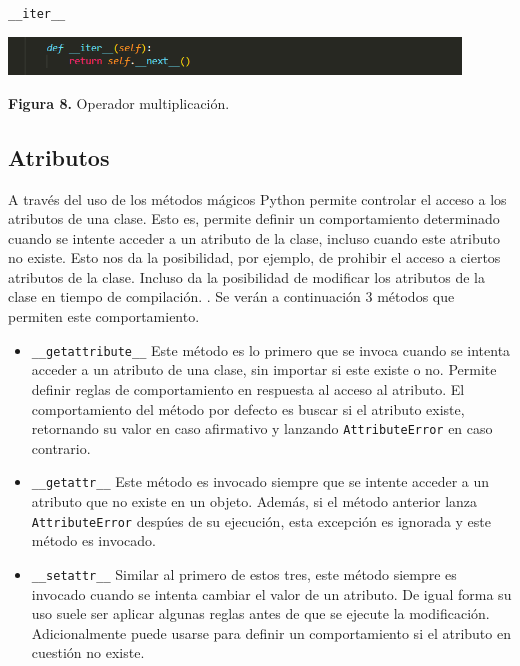 \documentclass[10pt]{article} %
\newcommand{\csl}[1]{\colorbox{backcolour}{\texttt{#1}}}
\newcommand{\imgcaption}[2]{\tiny \textbf{Figura #1.} #2.}
\newcommand{\mgc}[2][]{\colorbox{backcolour}{\texttt{\_\_#2\_\_#1}}}
\begin{document}
\mgc{iter}

\begin{center}
	\includegraphics[width=12cm]{iter.png}
	
	\imgcaption{8}{Operador multiplicaci\'on}
\end{center}

\subsection{Atributos}

A trav\'es del uso de los m\'etodos m\'agicos Python permite controlar el acceso a los atributos de una clase. Esto es, permite definir un comportamiento determinado cuando se intente acceder a un atributo de la clase, incluso cuando este atributo no existe. Esto nos da la posibilidad, por ejemplo, de prohibir el acceso a ciertos atributos de la clase. Incluso da la posibilidad de modificar los atributos de la clase en tiempo de compilaci\'on. . Se ver\'an a continuaci\'on 3  m\'etodos que permiten este comportamiento.

\begin{itemize}
	\item \mgc{getattribute} Este m\'etodo es lo primero que se invoca cuando se intenta acceder a un atributo de una clase, sin importar si este existe o no. Permite definir reglas de comportamiento en respuesta al acceso al atributo. El comportamiento del m\'etodo por defecto es buscar si el atributo existe, retornando su valor en caso afirmativo y lanzando \csl{AttributeError} en caso contrario.
	\item \mgc{getattr} Este m\'etodo es invocado siempre que se intente acceder a un atributo que no existe en un objeto. Adem\'as, si el m\'etodo anterior lanza \csl{AttributeError} desp\'ues de su ejecuci\'on, esta excepci\'on es ignorada y este m\'etodo es invocado. 
	\item \mgc{setattr} Similar al primero de estos tres, este m\'etodo siempre es invocado cuando se intenta cambiar el valor de un atributo. De igual forma su uso suele ser aplicar algunas reglas antes de que se ejecute la modificaci\'on. Adicionalmente puede usarse para definir un comportamiento si el atributo en cuesti\'on no existe.
\end{itemize}
\end{document}
